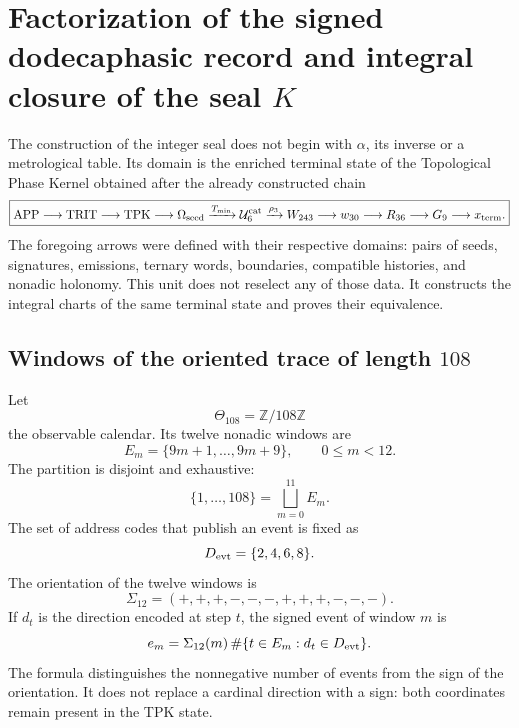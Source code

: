 
\section{Factorization of the signed dodecaphasic record and integral closure of the seal \(K\)}
\label{p3-83-c25-s4:chap:registro-dodecafasico-hadamard-k}

The construction of the integer seal does not begin with \(\alpha\), its inverse
or a metrological table. Its domain is the enriched terminal state
of the Topological Phase Kernel obtained after the already constructed chain
\begin{equation}
 \boxed{
 \mathrm{APP}\longrightarrow\mathrm{TRIT}\longrightarrow\mathrm{TPK}
 \longrightarrow\Omega_{\rm seed}
 \xrightarrow{T_{\min}}\mathcal U_6^{\rm cat}
 \xrightarrow{\rho_3}W_{243}
 \longrightarrow w_{30}\longrightarrow R_{36}
 \longrightarrow G_9\longrightarrow x_{\rm term}.}
 \label{p3-83-c25-s4:eq:cadena-upstream-registro-dodecafasico}
\end{equation}
The foregoing arrows were defined with their respective domains:
pairs of seeds, signatures, emissions, ternary words, boundaries,
compatible histories, and nonadic holonomy. This unit does not reselect
any of those data. It constructs the integral charts of the same
terminal state and proves their equivalence.

\subsection{Windows of the oriented trace of length \(108\)}

Let
\[
 \Theta_{108}=\mathbb Z/108\mathbb Z
\]
the observable calendar. Its twelve nonadic windows are
\[
 E_m=\{9m+1,\ldots,9m+9\},
 \qquad 0\leq m<12.
\]
The partition is disjoint and exhaustive:
\[
 \{1,\ldots,108\}=\bigsqcup_{m=0}^{11}E_m.
\]
The set of address codes that publish an event is fixed as
\[
 D_{\rm evt}=\{2,4,6,8\}.
\]
The orientation of the twelve windows is
\begin{equation}
 \Sigma_{12}=(+,+,+,-,-,-,+,+,+,-,-,-).
 \label{p3-83-c25-s4:eq:signatura-doce-ventanas}
\end{equation}
If \(d_t\) is the direction encoded at step \(t\), the signed event
of window \(m\) is
\begin{equation}
 e_m=\Sigma_{12}(m)\,
 \#\{t\in E_m:d_t\in D_{\rm evt}\}.
 \label{p3-83-c25-s4:eq:evento-firmado-ventana}
\end{equation}
The formula distinguishes the nonnegative number of events from the sign of the
orientation. It does not replace a cardinal direction with a sign: both
coordinates remain present in the TPK state.

